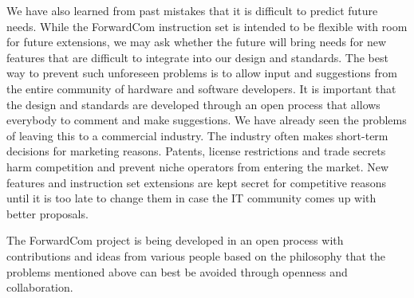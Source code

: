 \documentclass[forwardcom.tex]{subfiles}
\begin{document}
We have also learned from past mistakes that it is difficult to predict future needs. While the ForwardCom instruction set is intended to be flexible with room for future extensions, we may ask whether the future will bring needs for new features that are difficult to integrate into our design and standards. The best way to prevent such unforeseen problems is to allow input and suggestions from the entire community of hardware and software developers. It is important that the design and standards are developed through an open process that allows everybody to comment and make suggestions. We have already seen the problems of leaving this to a commercial industry. The industry often makes short-term decisions for marketing reasons. Patents, license restrictions and trade secrets harm competition and prevent niche operators from entering the market. New features and instruction set extensions are kept secret for competitive reasons until it is too late to change them in case the IT community comes up with better proposals.
\vspace{2mm}

The ForwardCom project is being developed in an open process with contributions and ideas from various people based on the philosophy that the problems mentioned above can best be avoided through openness and collaboration.
\end{document}
